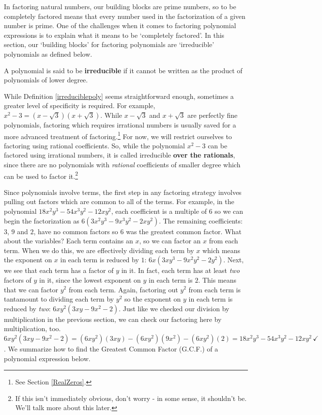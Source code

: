 \documentclass{ximera}
\begin{document}
 

In factoring natural numbers, our building blocks are prime numbers, so to be completely factored means that every number used in the factorization of a given number is prime. One of the challenges when it comes to factoring polynomial expressions is to explain what it means to be `completely factored'. In this section, our `building blocks' for factoring polynomials are `irreducible' polynomials as defined below.

 

\begin{definition}\label{irreduciblepoly}  A polynomial is said to be \textbf{irreducible} if it cannot be written as the product of polynomials of lower degree.
\end{definition}

 

While Definition \ref{irreduciblepoly} seems straightforward enough, sometimes a greater level of specificity is required. For example, $x^2 - 3 = (x-\sqrt{3})(x + \sqrt{3})$.  While $x-\sqrt{3}$ and $x+\sqrt{3}$ are perfectly fine polynomials, factoring which requires irrational numbers is usually saved for a more advanced treatment of factoring.\footnote{See Section \ref{RealZeros}.}  For now, we will restrict ourselves to factoring using rational coefficients. So, while the polynomial $x^2 - 3$ can be factored using irrational numbers, it is called irreducible \textbf{over the rationals}, since there are no polynomials with \textit{rational} coefficients of smaller degree which can be used to factor it.\footnote{If this isn't immediately obvious, don't worry - in some sense, it shouldn't be.  We'll talk more about this later.} 

 

Since polynomials involve terms, the first step in any factoring strategy involves pulling out factors which are common to all of the terms.  For example, in the polynomial $18x^2y^3 - 54x^3y^2 - 12xy^2$,  each coefficient is a multiple of $6$ so we can begin the factorization as $6(3x^2y^3 - 9x^3y^2 - 2xy^2)$.  The remaining coefficients: $3$, $9$ and $2$, have no common factors so $6$ was the greatest common factor.  What about the variables? Each term contains an $x$, so we can factor an $x$ from each term.  When we do this, we are effectively dividing each term by $x$ which means the exponent on  $x$ in each term is reduced by $1$:  $6x(3xy^3 - 9x^2y^2 - 2y^2)$.  Next, we see that each term has a factor of $y$ in it.  In fact, each term has at least \textit{two} factors of $y$ in it, since the lowest exponent on $y$ in each term is $2$. This means that we can factor $y^2$ from each term. Again, factoring out $y^2$ from each term is tantamount to dividing each term by $y^2$ so the exponent on $y$ in each term is reduced by \textit{two}:  $6xy^2(3xy - 9x^2 - 2)$.  Just like we checked our division by multiplication in the previous section, we can check our factoring here by multiplication, too.  $6xy^2(3xy - 9x^2 - 2) = (6xy^2)(3xy) - (6xy^2)(9x^2) - (6xy^2)(2) = 18x^2y^3 - 54x^3y^2  - 12xy^2 \, \checkmark$.  We summarize how to find the Greatest Common Factor (G.C.F.) of a polynomial expression below.
\end{document}
